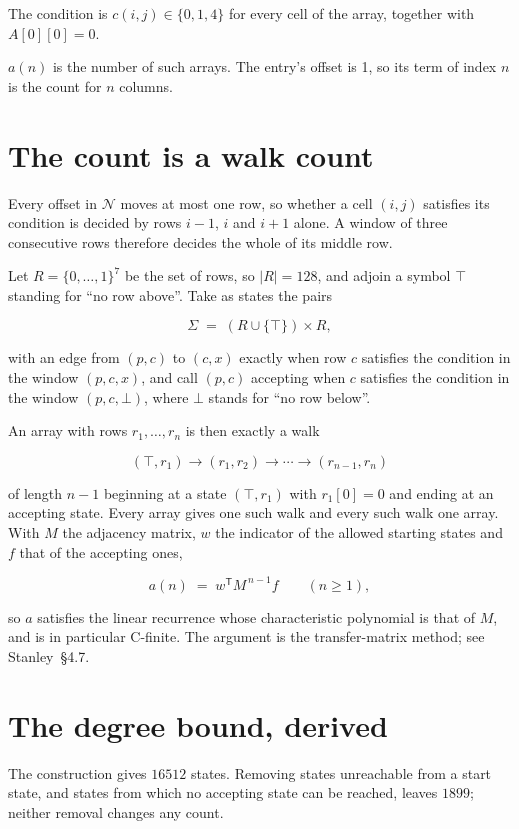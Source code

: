 \documentclass[11pt]{article}
\theoremstyle{definition}
\begin{document}
The condition is $c(i,j) \in \{0, 1, 4\}$ for every cell of the array, together with $A[0][0]=0$.

$a(n)$ is the number of such arrays. The entry's offset is 1, so its term of index $n$ is the count for $n$ columns.

\section{The count is a walk count}

Every offset in $\mathcal{N}$ moves at most one row, so whether a cell $(i,j)$ satisfies its condition is decided by rows $i-1$, $i$ and $i+1$ alone. A window of three consecutive rows therefore decides the whole of its middle row.

Let $R = \{0,\dots,1\}^{7}$ be the set of rows, so $|R| = 128$, and adjoin a symbol $\top$ standing for ``no row above''. Take as states the pairs

\[\Sigma \;=\; (R \cup \{\top\}) \times R,\]

with an edge from $(p,c)$ to $(c,x)$ exactly when row $c$ satisfies the condition in the window $(p,c,x)$, and call $(p,c)$ accepting when $c$ satisfies the condition in the window $(p,c,\bot)$, where $\bot$ stands for ``no row below''.

An array with rows $r_1,\dots,r_n$ is then exactly a walk

\[(\top,r_1) \to (r_1,r_2) \to \cdots \to (r_{n-1},r_n)\]

of length $n-1$ beginning at a state $(\top,r_1)$ with $r_1[0]=0$ and ending at an accepting state. Every array gives one such walk and every such walk one array. With $M$ the adjacency matrix, $w$ the indicator of the allowed starting states and $f$ that of the accepting ones,

\[a(n) \;=\; w^{\mathsf T} M^{\,n-1} f \qquad (n \ge 1),\]

so $a$ satisfies the linear recurrence whose characteristic polynomial is that of $M$, and is in particular C-finite. The argument is the transfer-matrix method; see Stanley~\S4.7.

\section{The degree bound, derived}

The construction gives $16512$ states. Removing states unreachable from a start state, and states from which no accepting state can be reached, leaves $1899$; neither removal changes any count.
\end{document}
